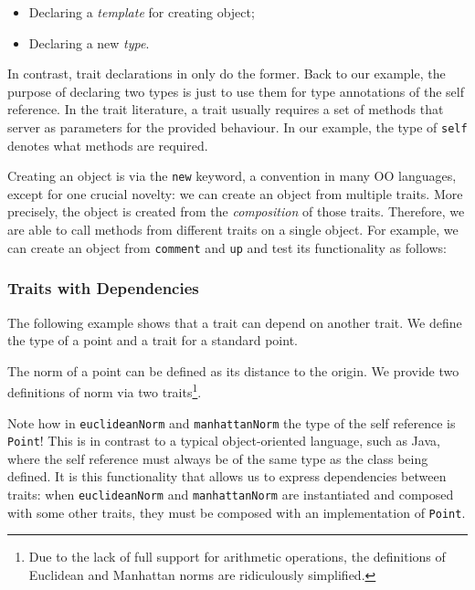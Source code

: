 \begin{itemize}
\item Declaring a \textit{template} for creating object;
\item Declaring a new \textit{type}.
\end{itemize}

In contrast, trait declarations in \name only do the former. Back to our
example, the purpose of declaring two types is just to use them for type
annotations of the self reference. In the trait literature, a trait usually
requires a set of methods that server as parameters for the provided behaviour.
In our example, the type of \lstinline$self$ denotes what methods are required.

Creating an object is via the \lstinline{new} keyword, a convention in many OO
languages, except for one crucial novelty: we can create an object from multiple
traits. More precisely, the object is created from the \textit{composition} of
those traits. Therefore, we are able to call methods from different traits on a
single object. For example, we can create an object from \lstinline$comment$ and
\lstinline$up$ and test its functionality as follows:


\subsubsection{Traits with Dependencies}

The following example shows that a trait can depend on another trait. We define
the type of a point and a trait for a standard point.


The norm of a point can be defined as its distance to the origin. We provide two
definitions of norm via two traits\footnote{Due to the lack of full support for
  arithmetic operations, the definitions of Euclidean and Manhattan norms are
  ridiculously simplified. }.


Note how in \lstinline$euclideanNorm$ and \lstinline$manhattanNorm$ the type of
the self reference is \lstinline$Point$! This is in contrast to a typical
object-oriented language, such as Java, where the self reference must always be
of the same type as the class being defined. It is this functionality that
allows us to express dependencies between traits: when \lstinline$euclideanNorm$
and \lstinline$manhattanNorm$ are instantiated and composed with some other
traits, they must be composed with an implementation of \lstinline$Point$.



